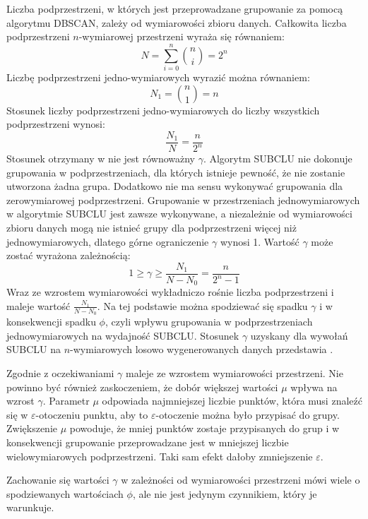 Liczba podprzestrzeni, w których jest przeprowadzane grupowanie za pomocą algorytmu DBSCAN, zależy od wymiarowości zbioru danych. Całkowita liczba podprzestrzeni $ n $-wymiarowej przestrzeni wyraża się równaniem:
\begin{equation}
	N = \displaystyle\sum_{i=0}^{n} \binom{n}{i} = 2^n
\end{equation}
Liczbę podprzestrzeni jedno-wymiarowych wyrazić można równaniem:
\begin{equation}
	N_1 = \binom{n}{1} = n
\end{equation}
Stosunek liczby podprzestrzeni jedno-wymiarowych do liczby wszystkich podprzestrzeni wynosi:
\begin{equation}
	\label{eq:odc:subspaces-to-subspaces-1d-count-ratio}
	\frac{N_1}{N} = \frac{n}{2^n}
\end{equation}
Stosunek otrzymany w   nie jest równoważny $ \gamma $. Algorytm SUBCLU nie dokonuje grupowania w podprzestrzeniach, dla których istnieje pewność, że nie zostanie utworzona żadna grupa. Dodatkowo nie ma sensu wykonywać grupowania dla zerowymiarowej podprzestrzeni. Grupowanie w przestrzeniach jednowymiarowych w algorytmie SUBCLU jest zawsze wykonywane, a niezależnie od wymiarowości zbioru danych mogą nie istnieć grupy dla podprzestrzeni więcej niż jednowymiarowych, dlatego górne ograniczenie $ \gamma $ wynosi 1. Wartość $ \gamma $ może zostać wyrażona zależnością:
\begin{equation}
	\label{eq:odc:subclu_1d_nd_subspaces_count_ratio}
	1 \ge \gamma \ge \frac{N_1}{N-N_0} = \frac{n}{2^n-1}
\end{equation}
Wraz ze wzrostem wymiarowości wykładniczo rośnie liczba podprzestrzeni i maleje wartość $ \frac{N_1}{N-N_0} $. Na tej podstawie można spodziewać się spadku $ \gamma $ i w konsekwencji spadku $ \phi $, czyli wpływu grupowania w podprzestrzeniach jednowymiarowych na wydajność SUBCLU. Stosunek $ \gamma $ uzyskany dla wywołań SUBCLU na $ n $-wymiarowych losowo wygenerowanych danych przedstawia .



Zgodnie z oczekiwaniami $ \gamma $ maleje ze wzrostem wymiarowości przestrzeni. Nie powinno być również zaskoczeniem, że dobór większej wartości $ \mu $ wpływa na wzrost $ \gamma $. Parametr $ \mu $ odpowiada najmniejszej liczbie punktów, która musi znaleźć się w $ \varepsilon $-otoczeniu punktu, aby to $ \varepsilon $-otoczenie można było przypisać do grupy. Zwiększenie $ \mu $ powoduje, że mniej punktów zostaje przypisanych do grup i w konsekwencji grupowanie przeprowadzane jest w mniejszej liczbie wielowymiarowych podprzestrzeni. Taki sam efekt dałoby zmniejszenie $ \varepsilon $.\par
Zachowanie się wartości $ \gamma $ w zależności od wymiarowości przestrzeni mówi wiele o spodziewanych wartościach $ \phi $, ale nie jest jedynym czynnikiem, który je warunkuje. 

